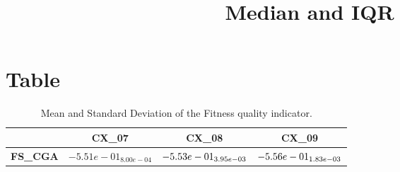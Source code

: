\documentclass{article}
\title{Median and IQR}
\author{}
\begin{document}
\maketitle
\section{Table}
\begin{table}[!htp]
  \caption{Mean and Standard Deviation of the Fitness quality indicator.}
  \label{table:Fitness}
  \centering
  \begin{scriptsize}
  \begin{tabular}{c|ccc}
      & \textbf{CX\_07} & \textbf{CX\_08} & \textbf{CX\_09} \\\hline
      \textbf{FS_CGA} & $-5.51e-01_{8.00e-04} $ & $ \cellcolor{gray95} -5.53e-01_{3.95e-03} $ & $ \cellcolor{gray25} -5.56e-01_{1.83e-03}$ \\
  \end{tabular}
  \end{scriptsize}
\end{table}
\end{document}
